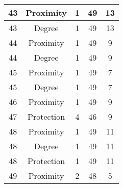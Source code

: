 \documentclass[results.tex]{subfiles}
\begin{document}
\begin{center}
\begin{tabular}{| c || c | c | c | c |}
            \hline
            43                      & Proximity                    & 1                      & 49                      & 13                   \\
            \hline
            43                      & Degree                       & 1                      & 49                      & 13                   \\
            \hline
            44                      & Proximity                    & 1                      & 49                      & 9                    \\
            \hline
            44                      & Degree                       & 1                      & 49                      & 9                    \\
            \hline
            45                      & Proximity                    & 1                      & 49                      & 7                    \\
            \hline
            45                      & Degree                       & 1                      & 49                      & 7                    \\
            \hline
            46                      & Proximity                    & 1                      & 49                      & 9                    \\
            \hline
            47                      & Protection                   & 4                      & 46                      & 9                    \\
            \hline
            48                      & Proximity                    & 1                      & 49                      & 11                   \\
            \hline
            48                      & Degree                       & 1                      & 49                      & 11                   \\
            \hline
            48                      & Protection                   & 1                      & 49                      & 11                   \\
            \hline
            49                      & Proximity                    & 2                      & 48                      & 5                    \\
            \hline
        \end{tabular}
    \end{center}
\end{document}
